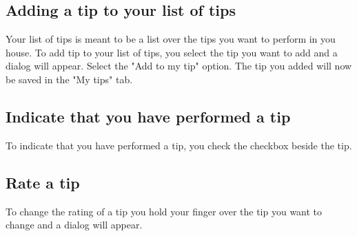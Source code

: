 \subsection{Adding a tip to your list of tips}
Your list of tips is meant to be a list over the tips you want to perform in you house. To add tip to your list of tips, you select the tip you want to add and a dialog will appear. Select the "Add to my tip" option. The tip you added will now be saved in the "My tips" tab. 
\subsection{Indicate that you have performed a tip}
To indicate that you have performed a tip, you check the checkbox beside the tip.
\subsection{Rate a tip}
To change the rating of a tip you hold your finger over the tip you want to change and a dialog will appear. 

